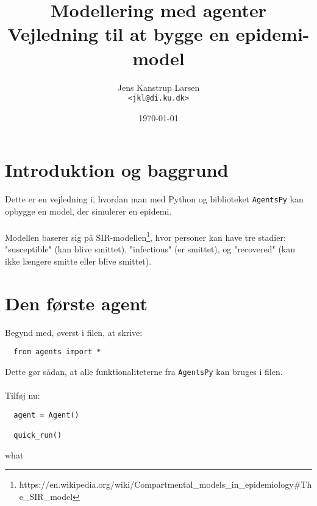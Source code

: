 \documentclass{article}
\title{Modellering med agenter\\
\large Vejledning til at bygge en epidemi-model}
\author{Jens Kanstrup Larsen\\ \texttt{<jkl@di.ku.dk>}}
\date{\today}
\begin{document}
\maketitle

\section{Introduktion og baggrund}
Dette er en vejledning i, hvordan man med Python og biblioteket \texttt{AgentsPy} kan opbygge en model, der simulerer en epidemi.\\\\
Modellen baserer sig på SIR-modellen\footnote{https://en.wikipedia.org/wiki/Compartmental\_models\_in\_epidemiology\#The\_SIR\_model}, hvor personer kan have tre stadier: "susceptible" (kan blive smittet), "infectious" (er smittet), og "recovered" (kan ikke længere smitte eller blive smittet).

\section{Den første agent}
Begynd med, øverst i filen, at skrive:
\begin{lstlisting}
  from agents import *
\end{lstlisting}
Dette gør sådan, at alle funktionaliteterne fra \texttt{AgentsPy} kan bruges i filen.\\\\
Tilføj nu:
\begin{lstlisting}
  agent = Agent()

  quick_run()
\end{lstlisting}
what
\end{document}
